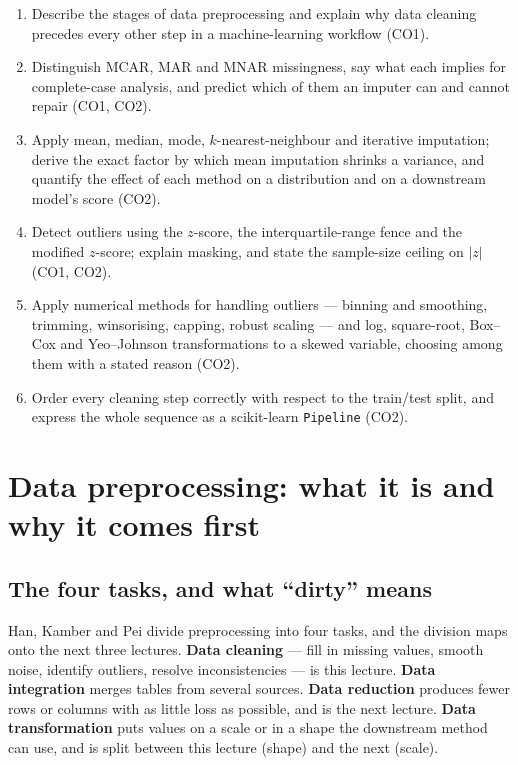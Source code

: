 \documentclass[11pt]{article}
\begin{document}
\begin{enumerate}[leftmargin=*]
  \item Describe the stages of data preprocessing and explain why data
    cleaning precedes every other step in a machine-learning workflow (CO1).
  \item Distinguish MCAR, MAR and MNAR missingness, say what each implies for
    complete-case analysis, and predict which of them an imputer can and
    cannot repair (CO1, CO2).
  \item Apply mean, median, mode, $k$-nearest-neighbour and iterative
    imputation; derive the exact factor by which mean imputation shrinks a
    variance, and quantify the effect of each method on a distribution and on
    a downstream model's score (CO2).
  \item Detect outliers using the $z$-score, the interquartile-range fence and
    the modified $z$-score; explain masking, and state the sample-size ceiling
    on $|z|$ (CO1, CO2).
  \item Apply numerical methods for handling outliers --- binning and
    smoothing, trimming, winsorising, capping, robust scaling --- and log,
    square-root, Box--Cox and Yeo--Johnson transformations to a skewed
    variable, choosing among them with a stated reason (CO2).
  \item Order every cleaning step correctly with respect to the train/test
    split, and express the whole sequence as a scikit-learn
    \texttt{Pipeline} (CO2).
\end{enumerate}

\section{Data preprocessing: what it is and why it comes first}
\label{sec:why}

\subsection{The four tasks, and what ``dirty'' means}

Han, Kamber and Pei divide preprocessing into four tasks, and the division maps
onto the next three lectures. \textbf{Data cleaning} --- fill in missing values,
smooth noise, identify outliers, resolve inconsistencies --- is this lecture.
\textbf{Data integration} merges tables from several sources. \textbf{Data
reduction} produces fewer rows or columns with as little loss as possible, and
is the next lecture. \textbf{Data transformation} puts values on a scale or in a
shape the downstream method can use, and is split between this lecture (shape)
and the next (scale).
\end{document}

